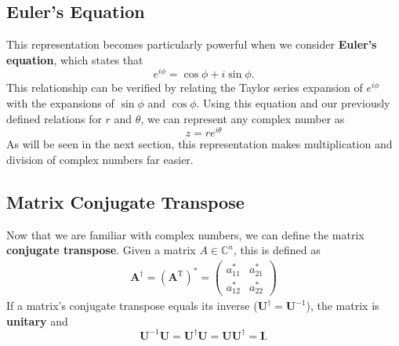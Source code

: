 \documentclass[11pt]{article} %
\begin{document}
\subsection{Euler's Equation}
This representation becomes particularly powerful when we consider \textbf{Euler's equation}, which states that
\begin{equation}
    e^{i\phi}=\cos\phi+i\sin\phi.\nonumber
\end{equation}
This relationship can be verified by relating the Taylor series expansion of $e^{i\phi}$ with the expansions of $\sin\phi$ and $\cos\phi$. Using this equation and our previously defined relations for $r$ and $\theta$, we can represent any complex number as \begin{equation}
    z=re^{i\theta}\nonumber
\end{equation}
As will be seen in the next section, this representation makes multiplication and division of complex numbers far easier.


\subsection{Matrix Conjugate Transpose}
Now that we are familiar with complex numbers, we can define the matrix \textbf{conjugate transpose}. Given a matrix $A \in \mathbb{C}^n$, this is defined as
\begin{align}
    \textbf{A}^\dagger = \left(\textbf{A}^\textrm{T}\right)^\ast =
    \begin{pmatrix}
        a_{11}^\ast & a_{21}^\ast \\
        a_{12}^\ast & a_{22}^\ast
    \end{pmatrix} \nonumber
\end{align}
If a matrix's conjugate transpose equals its inverse ($\textbf{U}^\dagger=\textbf{U}^{-1}$), the matrix is \textbf{unitary} and
\begin{equation}
    \textbf{U}^{-1}\textbf{U}=\textbf{U}^\dagger\textbf{U}=\textbf{U}\textbf{U}^\dagger=\textbf{I}.
    \nonumber
\end{equation}





\end{document}
